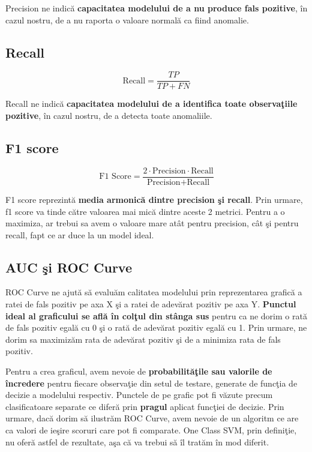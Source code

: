 Precision ne indică \textbf{capacitatea modelului de a nu produce fals pozitive}, în cazul nostru,
de a nu raporta o valoare normală ca fiind anomalie.

\subsection{Recall}

\begin{equation}
    \text{Recall} = \frac{TP}{TP + FN}
\end{equation}

Recall ne indică 
\textbf{capacitatea modelului de a identifica toate observaţiile pozitive},
în cazul nostru, de a detecta toate anomaliile.

\subsection{F1 score}

\begin{equation}
    \text{F1 Score} = \frac{2 \cdot \text{Precision} \cdot \text{Recall}}{\text{Precision} + \text{Recall}}
\end{equation}

F1 score reprezintă \textbf{media armonică dintre precision şi recall}. Prin urmare, f1 score 
va tinde către valoarea mai mică dintre aceste 2 metrici. Pentru a o maximiza,
ar trebui sa avem o valoare mare atât pentru precision, cât şi pentru recall,
fapt ce ar duce la un model ideal.

\subsection{AUC şi ROC Curve}

ROC Curve ne ajută să evaluăm calitatea modelului prin reprezentarea grafică 
a ratei de fals pozitiv pe axa X şi a ratei de adevărat pozitiv pe axa Y. 
\textbf{Punctul 
ideal al graficului se află în colţul din stânga sus} pentru ca ne dorim o 
rată de fals pozitiv egală cu 0 şi o rată de adevărat pozitiv egală cu 1. Prin urmare,
ne dorim sa maximizăm rata de adevărat pozitiv şi de a minimiza rata de fals pozitiv.

Pentru a crea graficul, avem nevoie de \textbf{probabilităţile sau valorile de încredere} 
pentru fiecare observaţie din setul de  testare, generate de funcţia de decizie a 
modelului respectiv. Punctele de pe grafic pot fi văzute precum clasificatoare 
separate ce diferă prin \textbf{pragul} aplicat funcţiei de decizie. Prin urmare, dacă
dorim să ilustrăm ROC Curve, avem nevoie de un algoritm ce are ca valori de ieşire
scoruri care pot fi comparate. One Class SVM, prin definiţie, nu oferă astfel de 
rezultate, aşa că va trebui să îl tratăm în mod diferit.

